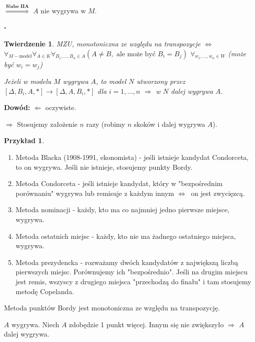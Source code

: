 \documentclass[12pt,a4paper]{article}
\theoremstyle{break}
\newtheorem{theorem}{Twierdzenie}[section]
\newtheorem{example}{Przykład}[section]
\newcommand{\witw}{$\Leftrightarrow$}
\begin{document}
		$\overset{\textbf{Słabe IIA}}{\Rightarrow}$ $A$ nie wygrywa w $M$.
		\begin{flushright}$\square$\end{flushright}
		
		\begin{theorem}
			MZU, monotoniczna ze względu na transpozycje \witw $\forall_{M - \text{model}} \forall_{A\in K} \forall_{B_1,\dots,B_n\in A} (A\neq B, \text{ ale może być } B_i=B_j)$
			$\forall_{w_1,\dots,w_n\in W}$ (może być $w_i=w_j$)
			
			Jeżeli w modelu $M$ wygrywa $A$, to model $N$ utworzony przez $[\Delta, B_i, A, *] \rightarrow [\Delta, A, B_i, *]$ dla $i=1,\dots,n$ $\Rightarrow$ w $N$ dalej wygrywa $A$.
			
		\end{theorem}
		
		\noindent \textbf{Dowód:} $\Leftarrow$ oczywiste.
		
		$\Rightarrow$ Stosujemy założenie $n$ razy (robimy $n$ skoków i dalej wygrywa $A$).
		
		\begin{example}
			
		\end{example}
		
		\begin{enumerate}[1.]
			\item Metoda Blacka (1908-1991, ekonomista) - jeśli istnieje kandydat Condorceta, to on wygrywa. Jeśli nie istnieje, stosujemy punkty Bordy.
			\item Metoda Condorceta - jeśli istnieje kandydat, który w "bezpośrednim porównaniu" wygrywa lub remisuje z każdym innym \witw$\:$  on jest zwycięzcą.
			\item Metoda nominacji - każdy, kto ma co najmniej jedno pierwsze miejsce, wygrywa.
			\item Metoda ostatnich miejsc - każdy, kto nie ma żadnego ostatniego miejsca, wygrywa.
			\item Metoda prezydencka - rozważamy dwóch kandydatów z największą liczbą pierwszych miejsc. Porównujemy ich "bezpośrednio". Jeśli na drugim miejscu jest remis, wszyscy z drugiego miejsca "przechodzą do finału" i tam stosujemy metodę Copelanda.
		\end{enumerate}
		
		Metoda punktów Bordy jest monotoniczna ze względu na transpozycję.
		
		$A$ wygrywa. Niech $A$ zdobędzie 1 punkt więcej. Innym się nie zwiększyło $\Rightarrow$ $A$ dalej wygrywa.\\\\
		
\end{document}
